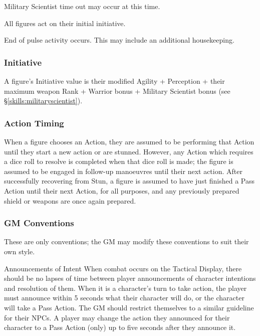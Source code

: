\begin{multicols*}{3}
\begin{Enumerate}
\item Military Scientist time out may occur at this time.

\item All figures act on their initial initiative.

\item
End of pulse activity occurs. This may include an additional
housekeeping.

\end{Enumerate}

\subsubsection{Initiative}
\label{combat:initiative}

A figure's Initiative value is their modified Agility + Perception +
their maximum weapon Rank + Warrior bonus + Military Scientist bonus
(see \S\ref{skills:militaryscientist}).

\subsubsection{Action Timing}

When a figure chooses an Action, they are assumed to be performing
that Action until they start a new action or are stunned. However, any
Action which requires a dice roll to resolve is completed when that
dice roll is made; the figure is assumed to be engaged in follow-up
manoeuvres until their next action.  After successfully recovering
from Stun, a figure is assumed to have just finished a Pass Action
until their next Action, for all purposes, and any previously prepared
shield or weapons are once again prepared.

\subsubsection{GM Conventions}

These are only conventions; the GM may modify these conventions to
suit their own style.
\begin{Description}
\item[Announcements of Intent] When combat occurs on the Tactical
Display, there should be no lapses of time between player
announcements of character intentions and resolution of them. When it
is a character's turn to take action, the player must announce within
5 seconds what their character will do, or the character will take a
Pass Action. The GM should restrict themselves to a similar guideline
for their NPCs. A player may change the action they announced for
their character to a Pass Action (only) up to five seconds after they
announce it.


\end{Description}
\end{multicols*}
